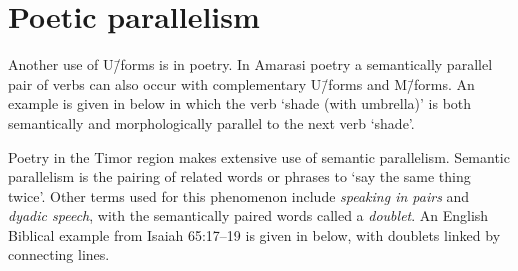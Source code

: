 \section{Poetic parallelism}\label{sec:PoePar}
Another use of U\=/forms is in poetry.
In Amarasi poetry a semantically parallel pair of verbs
can also occur with complementary U\=/forms and M\=/forms.
An example is given in  below
in which the verb  `shade (with umbrella)'
is both semantically and morphologically parallel
to the next verb  `shade'.

\begin{exe}
	\label{ex:130825-3, 1.21}
\end{exe}

Poetry in the Timor region makes extensive use of semantic parallelism.
Semantic parallelism is the pairing of related words or phrases to `say the same thing twice'.
Other terms used for this phenomenon include \emph{speaking in pairs}
and \emph{dyadic speech}, with the semantically paired words called a \emph{doublet}.
An English Biblical example from Isaiah 65:17--19 is given in
 below, with doublets linked by connecting lines.

